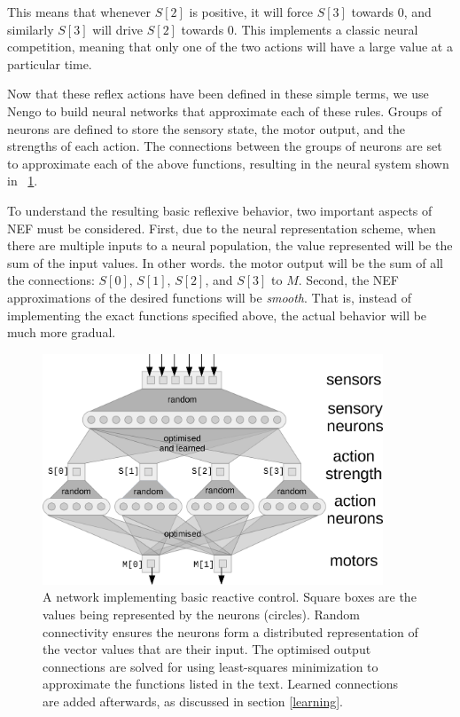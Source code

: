 \documentclass{frontiersSCNS}
\begin{document}
This means that whenever $S[2]$ is positive, it will force $S[3]$ towards $0$, 
and similarly $S[3]$ will drive $S[2]$ towards $0$.  This implements a classic
neural competition, meaning that only one of the two actions will have a large
value at a particular time.

Now that these reflex actions have been defined in these simple terms, we use
Nengo to build neural networks that approximate each of these rules.  Groups
of neurons are defined to store the sensory state, the motor output, and the 
strengths of each action. The connections between the groups of neurons are 
set to approximate each of the above functions, resulting in the neural 
system shown in \figurename~\ref{Flow}. 

To understand the resulting basic reflexive behavior,
two important aspects of NEF must be considered. First, due to the neural 
representation scheme, when there are multiple inputs to a neural population, 
the value represented will be the sum of the input values. In other words. the 
motor output will be the sum of all the connections: $S[0]$, $S[1]$, $S[2]$, and $S[3]$ to $M$. 
Second, the NEF approximations of the desired functions will be \textit{smooth}. 
That is, instead of implementing the exact functions specified above, the 
actual behavior will be much more gradual. 

\begin{figure}[!t]
\centering
\includegraphics[width=4in]{../figures/network.png}
\caption{A network implementing basic reactive control. Square boxes are the
values being represented by the neurons (circles).  Random connectivity
ensures the neurons form a distributed representation of the vector values
that are their input.  The optimised output connections are solved for
using least-squares minimization to approximate the functions listed in
the text.  Learned connections are added afterwards, as discussed in 
section \ref{learning}.}
\label{Flow}
\end{figure}
\end{document}
